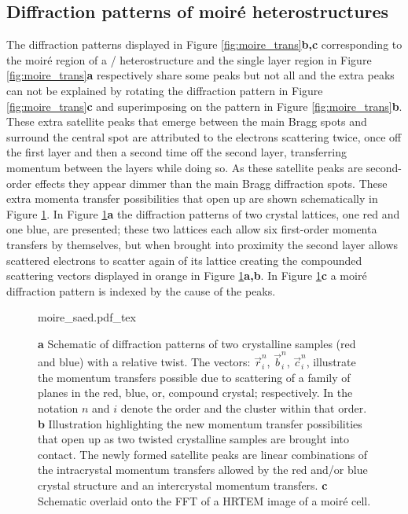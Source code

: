 \subsection{Diffraction patterns of moiré heterostructures}
The diffraction patterns displayed in Figure \ref{fig:moire_trans}\textbf{b,c} corresponding to the moiré region of a /\- heterostructure and the single layer region in Figure \ref{fig:moire_trans}\textbf{a} respectively share some peaks but not all and the extra peaks can not be explained by rotating the diffraction pattern in Figure \ref{fig:moire_trans}\textbf{c} and superimposing on the pattern in Figure \ref{fig:moire_trans}\textbf{b}.
These extra satellite peaks that emerge between the main Bragg spots and surround the central spot are attributed to the electrons scattering twice, once off the first layer and then a second time off the second layer, transferring momentum between the layers while doing so. As these satellite peaks are second-order effects they appear dimmer than the main Bragg diffraction spots.
These extra momenta transfer possibilities that open up are shown schematically in Figure \ref{fig:moire_saed}. In Figure \ref{fig:moire_saed}\textbf{a} the diffraction patterns of two crystal lattices, one red and one blue, are presented; these two lattices each allow six first-order momenta transfers by themselves, but when brought into proximity the second layer allows scattered electrons to scatter again of its lattice creating the compounded scattering vectors displayed in orange in Figure \ref{fig:moire_saed}\textbf{a,b}. In Figure \ref{fig:moire_saed}\textbf{c} a moiré diffraction pattern is indexed by the cause of the peaks.

\begin{figure}[h]
    \centering
    \def\svgwidth{1\linewidth}
    {moire_saed.pdf_tex}
    \caption{\textbf{a} Schematic of diffraction patterns of two crystalline samples (red and blue) with a relative twist. The vectors: $\vec{r}_i^n$, $\vec{b}_i^n$, $\vec{c}_i^n$, illustrate the momentum transfers possible due to scattering of a family of planes in the red, blue, or, compound crystal; respectively. In the notation $n$ and $i$ denote the order and the cluster within that order. \textbf{b} Illustration highlighting the new momentum transfer possibilities that open up as two twisted crystalline samples are brought into contact. The newly formed satellite peaks are linear combinations of the intracrystal momentum transfers allowed by the red and/or blue crystal structure and an intercrystal momentum transfers. \textbf{c} Schematic overlaid onto the FFT of a HRTEM image of a moiré cell.}
    \label{fig:moire_saed}
\end{figure}

